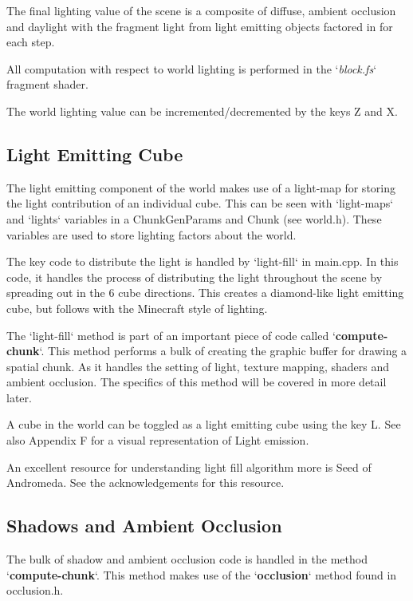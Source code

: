 \documentclass{book}
\begin{document}
The final lighting value of the scene is a composite of diffuse, ambient occlusion and daylight with the fragment light from light emitting objects factored in for each step. 
    
All computation with respect to world lighting is performed in the `\textit{block.fs}` fragment shader.  
    
The world lighting value can be incremented/decremented by the keys Z and X.
    
\subsection{Light Emitting Cube}
The light emitting component of the world makes use of a light-map for storing the light contribution of an individual cube.  This can be seen with `light-maps` and `lights` variables in a ChunkGenParams and Chunk (see world.h).  These variables are used to store lighting factors about the world.
    
The key code to distribute the light is handled by `light-fill` in main.cpp.  In this code, it handles the process of distributing the light throughout the scene by spreading out in the 6 cube directions.  This creates a diamond-like light emitting cube, but follows with the Minecraft style of lighting.
    
The `light-fill` method is part of an important piece of code called `\textbf{compute-chunk}`.  This method performs a bulk of creating the graphic buffer for drawing a spatial chunk.  As it handles the setting of light, texture mapping, shaders and ambient occlusion.  The specifics of this method will be covered in more detail later.
    
A cube in the world can be toggled as a light emitting cube using the key L. See also Appendix F for a visual representation of Light emission.
    
An excellent resource for understanding light fill algorithm more is Seed of Andromeda.  See the acknowledgements for this resource. 
    
\subsection{Shadows and Ambient Occlusion}
    
The bulk of shadow and ambient occlusion code is handled in the method `\textbf{compute-chunk}`. This method makes use of the `\textbf{occlusion}` method found in occlusion.h.  
    
\end{document}
